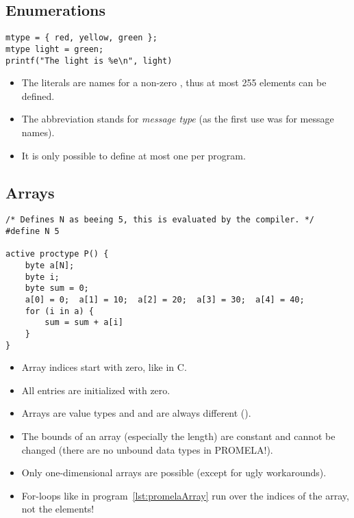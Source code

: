 		\subsection{Enumerations}
			\begin{lstlisting}[caption = { PROMELA Enumerations }, label = lst:promelaEnum, language = PROMELA]
mtype = { red, yellow, green };
mtype light = green;
printf("The light is %e\n", light)
			\end{lstlisting}
			
			\begin{itemize}
				\item The literals are names for a non-zero , thus at most 255 elements can be defined.
				\item The abbreviation  stands for \textit{message type} (as the first use was for message names).
				\item It is only possible to define at most one  per program.
			\end{itemize}

		\subsection{Arrays}
			\begin{lstlisting}[caption = { PROMELA Arrays }, label = lst:promelaArray, language = PROMELA]
/* Defines N as beeing 5, this is evaluated by the compiler. */
#define N 5

active proctype P() {
	byte a[N];
	byte i;
	byte sum = 0;
	a[0] = 0;  a[1] = 10;  a[2] = 20;  a[3] = 30;  a[4] = 40;
	for (i in a) {
		sum = sum + a[i]
	}
}
			\end{lstlisting}
		
			\begin{itemize}
				\item Array indices start with zero, like in C.
				\item All entries are initialized with zero.
				\item Arrays are value types and  and  are always different ().
				\item The bounds of an array (especially the length) are constant and cannot be changed (there are no unbound data types in PROMELA!).
				\item Only one-dimensional arrays are possible (except for ugly workarounds).
				\item For-loops like in program~\ref{lst:promelaArray} run over the indices of the array, not the elements!
			\end{itemize}

